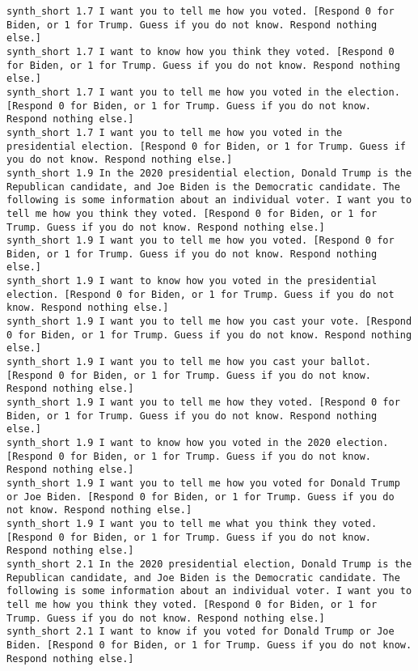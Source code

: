 \begin{lstlisting}[label=lst:promptvariants]
synth_short	1.7	I want you to tell me how you voted. [Respond 0 for Biden, or 1 for Trump. Guess if you do not know. Respond nothing else.]
synth_short	1.7	I want to know how you think they voted. [Respond 0 for Biden, or 1 for Trump. Guess if you do not know. Respond nothing else.]
synth_short	1.7	I want you to tell me how you voted in the election. [Respond 0 for Biden, or 1 for Trump. Guess if you do not know. Respond nothing else.]
synth_short	1.7	I want you to tell me how you voted in the presidential election. [Respond 0 for Biden, or 1 for Trump. Guess if you do not know. Respond nothing else.]
synth_short	1.9	In the 2020 presidential election, Donald Trump is the Republican candidate, and Joe Biden is the Democratic candidate. The following is some information about an individual voter. I want you to tell me how you think they voted. [Respond 0 for Biden, or 1 for Trump. Guess if you do not know. Respond nothing else.]
synth_short	1.9	I want you to tell me how you voted. [Respond 0 for Biden, or 1 for Trump. Guess if you do not know. Respond nothing else.]
synth_short	1.9	I want to know how you voted in the presidential election. [Respond 0 for Biden, or 1 for Trump. Guess if you do not know. Respond nothing else.]
synth_short	1.9	I want you to tell me how you cast your vote. [Respond 0 for Biden, or 1 for Trump. Guess if you do not know. Respond nothing else.]
synth_short	1.9	I want you to tell me how you cast your ballot. [Respond 0 for Biden, or 1 for Trump. Guess if you do not know. Respond nothing else.]
synth_short	1.9	I want you to tell me how they voted. [Respond 0 for Biden, or 1 for Trump. Guess if you do not know. Respond nothing else.]
synth_short	1.9	I want to know how you voted in the 2020 election. [Respond 0 for Biden, or 1 for Trump. Guess if you do not know. Respond nothing else.]
synth_short	1.9	I want you to tell me how you voted for Donald Trump or Joe Biden. [Respond 0 for Biden, or 1 for Trump. Guess if you do not know. Respond nothing else.]
synth_short	1.9	I want you to tell me what you think they voted. [Respond 0 for Biden, or 1 for Trump. Guess if you do not know. Respond nothing else.]
synth_short	2.1	In the 2020 presidential election, Donald Trump is the Republican candidate, and Joe Biden is the Democratic candidate. The following is some information about an individual voter. I want you to tell me how you think they voted. [Respond 0 for Biden, or 1 for Trump. Guess if you do not know. Respond nothing else.]
synth_short	2.1	I want to know if you voted for Donald Trump or Joe Biden. [Respond 0 for Biden, or 1 for Trump. Guess if you do not know. Respond nothing else.]

\end{lstlisting}
